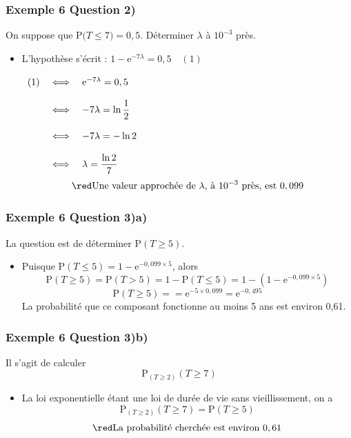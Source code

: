 \documentclass[xcolor=svgnames,t,final]{beamer}
\newcommand{\proba}[1]{\text{P}\big(#1\big)}
\begin{document}
\begin{frame}


\frametitle{Exemple 6 Question 2)}
On suppose que $\proba{T \leqslant 7}=0,5$. Déterminer $\lambda$ à $10^{-3}$ près.

\begin{itemize}
\pause \item L'hypothèse s'écrit : $1-\text{e}^{-7\lambda}=0,5\quad (1)$

$\begin{array}[t]{lcl}
(1)&\iff&\text{e}^{-7\lambda}=0,5\\
&&\\
&\iff&-7\lambda=\ln \dfrac{1}{2} \\
&&\\
&\iff&-7\lambda=-\ln 2 \\
&&\\
&\iff&\lambda=\dfrac{\ln 2}{7}
\end{array}$
\[\red \text{Une valeur approchée de }\lambda\text{, à  }10^{-3}\text{ près, est } 0,099\]

\end{itemize}


\end{frame}


\begin{frame}


\frametitle{Exemple 6 Question 3)a)}

La question est de déterminer P$(T\geqslant 5)$.


\begin{itemize}
\pause \item 
Puisque P$(T\leqslant 5)=1-\text{e}^{-0,099\times 5}$, alors 
\[\text{P} (T\geqslant 5)=\text{P}(T>5)=1-\text{P}(T\leqslant 5)=1-(1-\text{e}^{-0,099\times 5})\]
\[\text{P} (T\geqslant 5)==\text{e}^{-5\times 0,099}=\text{e}^{-0,495}\]		
La probabilité que ce composant fonctionne au moins 5 ans est environ  0,61.


\end{itemize}


\end{frame}




\begin{frame}


\frametitle{Exemple 6 Question 3)b)}

Il s'agit de calculer 
\[\text{P}_{(T\geqslant 2)}(T\geqslant 7)\]	


\begin{itemize}

	\pause	\item
	
La loi exponentielle étant une loi de durée de vie sans vieillissement, on a 
\[\text{P}_{(T\geqslant 2)}(T\geqslant 7)=\text{P}(T\geqslant 5)\]	\[\red\text{La probabilité cherchée est environ } 0,61\]


\end{itemize}


\end{frame}
\end{document}
